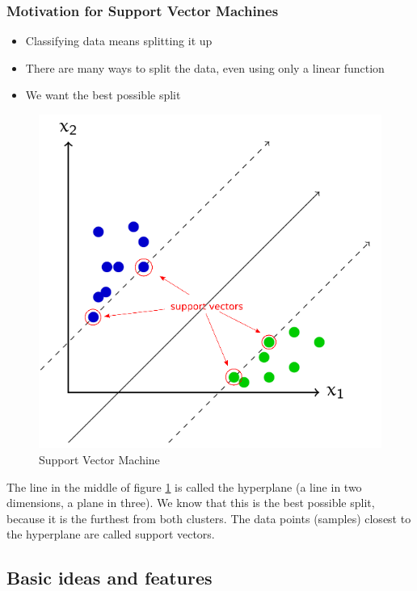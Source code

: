 \documentclass[11pt]{article}
\begin{document}
\subsubsection{Motivation for Support Vector Machines}

\begin{itemize}
    \item Classifying data means splitting it up
    \item There are many ways to split the data, even using only a linear function
    \item We want the best possible split
\end{itemize}

\begin{figure}
    \centering
    \includegraphics[keepaspectratio,width=0.4\linewidth]{Pictures/support_vector_machine_ex1}
    \caption{Support Vector Machine}
    \label{fig:supportvectormachineex1}
\end{figure}

The line in the middle of figure \ref{fig:supportvectormachineex1} is called the hyperplane (a line in two dimensions, a plane in three). We know that this is the best possible split, because it is the furthest from both clusters. The data points (samples) closest to the hyperplane are called support vectors.

\subsection{Basic ideas and features}
\end{document}
